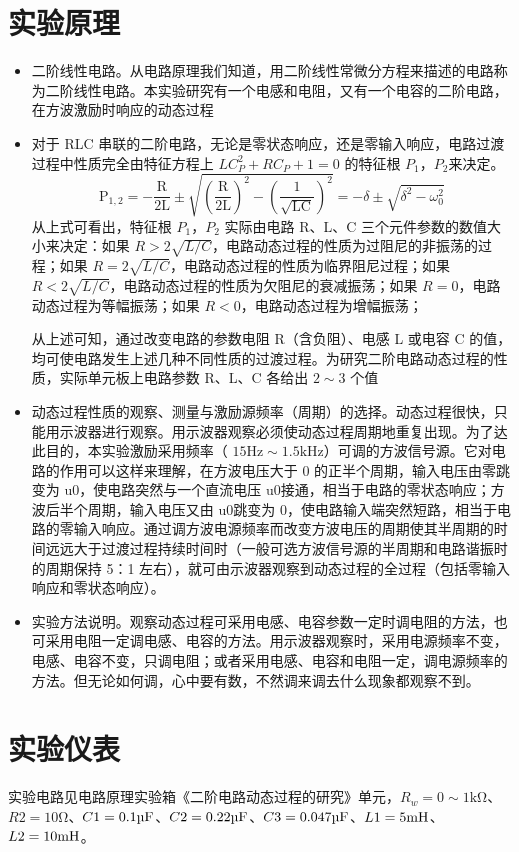\documentclass[a4paper,utf8]{article}
\begin{document}
\section{实验原理}%
\begin{itemize}
    \item 二阶线性电路。从电路原理我们知道，用二阶线性常微分方程来描述的电路称为二阶线性电路。本实验研究有一个电感和电阻，又有一个电容的二阶电路，在方波激励时响应的动态过程
    \item 对于 RLC 串联的二阶电路，无论是零状态响应，还是零输入响应，电路过渡过程中性质完全由特征方程上 $LC_P^2+RC_P+1=0$ 的特征根 $P_1$，$P_2$来决定。$$\mathrm{P}_{1,2}=-\frac{\mathrm{R}}{2\mathrm{L}}\pm\sqrt{(\frac{\mathrm{R}}{2\mathrm{L}})^2-(\frac{1}{\sqrt{\mathrm{LC}}})^2}=-\delta\pm\sqrt{\delta^2-\omega_0^2}$$
    从上式可看出，特征根 $P_1$，$P_2$ 实际由电路 R、L、C 三个元件参数的数值大小来决定：如果 $R>2\sqrt{L/C}$，电路动态过程的性质为过阻尼的非振荡的过程；如果 $R=2\sqrt{L/C}$，电路动态过程的性质为临界阻尼过程；如果 $R<2\sqrt{L/C}$，电路动态过程的性质为欠阻尼的衰减振荡；如果 $R=0$，电路动态过程为等幅振荡；如果 $R<0$，电路动态过程为增幅振荡；\par
    从上述可知，通过改变电路的参数电阻 R（含负阻）、电感 L 或电容 C 的值，均可使电路发生上述几种不同性质的过渡过程。为研究二阶电路动态过程的性质，实际单元板上电路参数 R、L、C 各给出 $2 \sim 3$ 个值
    \item 动态过程性质的观察、测量与激励源频率（周期）的选择。动态过程很快，只能用示波器进行观察。用示波器观察必须使动态过程周期地重复出现。为了达此目的，本实验激励采用频率（ $15\unit{\Hz} \sim 1.5\unit{\kHz}$）可调的方波信号源。它对电路的作用可以这样来理解，在方波电压大于 0 的正半个周期，输入电压由零跳变为 u0，使电路突然与一个直流电压 u0接通，相当于电路的零状态响应；方波后半个周期，输入电压又由 u0跳变为 0，使电路输入端突然短路，相当于电路的零输入响应。通过调方波电源频率而改变方波电压的周期使其半周期的时间远远大于过渡过程持续时间时（一般可选方波信号源的半周期和电路谐振时的周期保持 5：1 左右），就可由示波器观察到动态过程的全过程（包括零输入响应和零状态响应）。
    
    \item 实验方法说明。观察动态过程可采用电感、电容参数一定时调电阻的方法，也可采用电阻一定调电感、电容的方法。用示波器观察时，采用电源频率不变，电感、电容不变，只调电阻；或者采用电感、电容和电阻一定，调电源频率的方法。但无论如何调，心中要有数，不然调来调去什么现象都观察不到。
\end{itemize}

\section{实验仪表}
    实验电路见电路原理实验箱《二阶电路动态过程的研究》单元，$R_w=0 \sim 1\unit{\kilo\ohm}$、$R2= 10\unit{\ohm}$、$C1= 0.1\unit{\uF}$、$C2= 0.22\unit{\uF}$、$C3= 0.047\unit{\uF}$、$L1= 5\unit{\mH}$、$L2= 10\unit{\mH}$。
\end{document}
